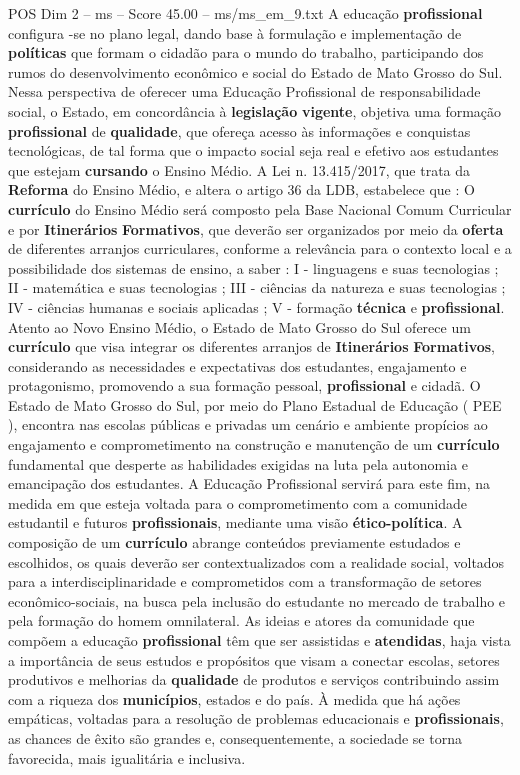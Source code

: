 \begin{textsample}{POS Dim 2 – ms – Score 45.00 – ms/ms\_em\_9.txt}
A educação \textbf{profissional} configura -se no plano legal, dando base à formulação e implementação de \textbf{políticas} que formam o cidadão para o mundo do trabalho, participando dos rumos do desenvolvimento econômico e social do Estado de Mato Grosso do Sul.
Nessa perspectiva de oferecer uma Educação Profissional de responsabilidade social, o Estado, em concordância à \textbf{legislação} \textbf{vigente}, objetiva uma formação \textbf{profissional} de \textbf{qualidade}, que ofereça acesso às informações e conquistas tecnológicas, de tal forma que o impacto social seja real e efetivo aos estudantes que estejam \textbf{cursando} o Ensino Médio.
A Lei n. 13.415/2017, que trata da \textbf{Reforma} do Ensino Médio, e altera o artigo 36 da LDB, estabelece que : O \textbf{currículo} do Ensino Médio será composto pela Base Nacional Comum Curricular e por \textbf{Itinerários} \textbf{Formativos}, que deverão ser organizados por meio da \textbf{oferta} de diferentes arranjos curriculares, conforme a relevância para o contexto local e a possibilidade dos sistemas de ensino, a saber : I - linguagens e suas tecnologias ; II - matemática e suas tecnologias ; III - ciências da natureza e suas tecnologias ; IV - ciências humanas e sociais aplicadas ; V - formação \textbf{técnica} e \textbf{profissional}.
Atento ao Novo Ensino Médio, o Estado de Mato Grosso do Sul oferece um \textbf{currículo} que visa integrar os diferentes arranjos de \textbf{Itinerários} \textbf{Formativos}, considerando as necessidades e expectativas dos estudantes, engajamento e protagonismo, promovendo a sua formação pessoal, \textbf{profissional} e cidadã.
O Estado de Mato Grosso do Sul, por meio do Plano Estadual de Educação ( PEE ), encontra nas escolas públicas e privadas um cenário e ambiente propícios ao engajamento e comprometimento na construção e manutenção de um \textbf{currículo} fundamental que desperte as habilidades exigidas na luta pela autonomia e emancipação dos estudantes.
A Educação Profissional servirá para este fim, na medida em que esteja voltada para o comprometimento com a comunidade estudantil e futuros \textbf{profissionais}, mediante uma visão \textbf{ético-política}.
A composição de um \textbf{currículo} abrange conteúdos previamente estudados e escolhidos, os quais deverão ser contextualizados com a realidade social, voltados para a interdisciplinaridade e comprometidos com a transformação de setores econômico-sociais, na busca pela inclusão do estudante no mercado de trabalho e pela formação do homem omnilateral.
As ideias e atores da comunidade que compõem a educação \textbf{profissional} têm que ser assistidas e \textbf{atendidas}, haja vista a importância de seus estudos e propósitos que visam a conectar escolas, setores produtivos e melhorias da \textbf{qualidade} de produtos e serviços contribuindo assim com a riqueza dos \textbf{municípios}, estados e do país.
À medida que há ações empáticas, voltadas para a resolução de problemas educacionais e \textbf{profissionais}, as chances de êxito são grandes e, consequentemente, a sociedade se torna favorecida, mais igualitária e inclusiva.


\end{textsample}
